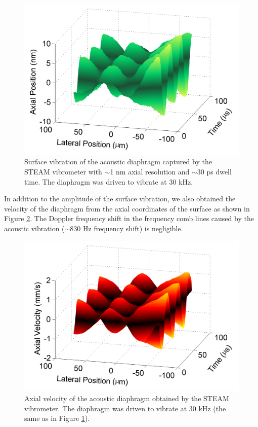 \begin{figure}[htb!]
\centering
\includegraphics[scale=1]{APL2011/Figure3.png}
\caption{Surface vibration of the acoustic diaphragm captured by the STEAM vibrometer with $\sim$1 nm axial resolution and $\sim$30 ps dwell time. The diaphragm was driven to vibrate at 30 kHz.}
\label{fig:APL2011_Figure3}
\end{figure}

In addition to the amplitude of the surface vibration, we also obtained the velocity of the diaphragm from the axial coordinates of the surface as shown in Figure \ref{fig:APL2011_Figure4}. The Doppler frequency shift in the frequency comb lines caused by the acoustic vibration ($\sim$830 Hz frequency shift) is negligible.

\begin{figure}[htb!]
\centering
\includegraphics[scale=1]{APL2011/Figure4.png}
\caption{Axial velocity of the acoustic diaphragm obtained by the STEAM vibrometer. The diaphragm was driven to vibrate at 30 kHz (the same as in Figure \ref{fig:APL2011_Figure3}).}
\label{fig:APL2011_Figure4}
\end{figure}

